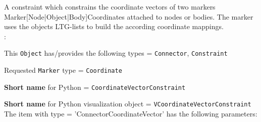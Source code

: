 \ei

%
\newpage


\label{sec:item:ObjectConnectorCoordinateVector}
A constraint which constrains the coordinate vectors of two markers Marker[Node|Object|Body]Coordinates attached to nodes or bodies. The marker uses the objects \ac{LTG}-lists to build the according coordinate mappings.
\vspace{12pt}\\

\noindent {}:
\bi
  \item This \texttt{Object} has/provides the following types = \texttt{Connector}, \texttt{Constraint}
  \item Requested \texttt{Marker} type = \texttt{Coordinate}
  \item {\bf Short name} for Python = \texttt{CoordinateVectorConstraint}
  \item {\bf Short name} for Python visualization object = \texttt{VCoordinateVectorConstraint}
\ei\vspace{12pt} \noindent 
The item  with type = 'ConnectorCoordinateVector' has the following parameters:
\vspace{-0.5cm}\\
\vspace{-0.5cm}\\
